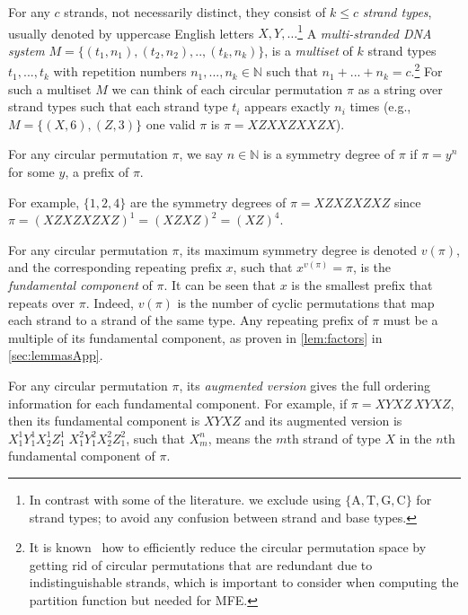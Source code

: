 For any $c$ strands, not necessarily distinct, they consist of $k \leq c$ \emph{strand types}, usually denoted by uppercase English letters $X,Y,\ldots$\footnote{In contrast with some of the literature. we exclude using $\{\mathrm{A},\mathrm{T},\mathrm{G},\mathrm{C}\}$ for strand types; to avoid any confusion between strand and base types.}
A {\em multi-stranded DNA system} 
$M = \{(t_1,n_1),(t_2,n_2), ..,(t_k,n_k)\}$,  
is a \emph{multiset} of $k$ strand types $t_1,  ..., t_k$ with repetition numbers 
$n_1,  ..., n_k \in \mathbb{N}$ such that $n_1+ ...+n_k = c$.\footnote{It is known~\cite{sawada2003fast} how to efficiently reduce the circular permutation space by getting rid of  circular permutations that are redundant due to indistinguishable strands, which is important to consider when computing the  partition function but needed for MFE.} 
For such a multiset $M$
we can think of each circular permutation $\pi$  as a string over strand types such that each strand type $t_i$ appears exactly $n_i$ times (e.g., $M = \{(X,6),(Z,3)\}$ one valid $\pi$ is $\pi = XZXXZXXZX$). 



\begin{Definition} \label{def:sym}
	For any circular permutation $\pi$, we say $n \in \mathbb{N}$ is a symmetry degree of $\pi$ if $\pi = y^n$ for some $y$, a prefix of $\pi$. 
\end{Definition}

\noindent For example, $\{1,2,4\}$ are the symmetry degrees of $\pi = XZXZXZXZ$ since $\pi = (XZXZXZXZ)^1 = (XZXZ)^2 = (XZ)^4$.

For any circular permutation $\pi$, 
its maximum symmetry degree is denoted $v(\pi)$, and the corresponding repeating prefix $x$, such that $x^{v(\pi)} = \pi$, is the \emph{fundamental component} of $\pi$. 
It can be seen that $x$ is the smallest prefix that repeats over $\pi$. 
Indeed, $v(\pi)$ is the number of cyclic permutations that map each strand to a strand of the same type. 
Any repeating prefix of $\pi$ must be a multiple of its fundamental component, as proven in \cref{lem:factors} in \cref{sec:lemmasApp}.


\begin{remark}[Notation: $X_m^n$]
	For any circular permutation $\pi$, 
	its \emph{augmented version}  gives the full ordering information for each fundamental component. 
	For example, 
	if $\pi = XYXZ \, XYXZ$, then its fundamental component is $XYXZ$ and its augmented version is 
	$ X_1^1 Y_1^1 X_2^1 Z_1^1  \; X_1^2 Y_1^2 X_2^2 Z_1^2$, such that  $X_m^n$, means the $m$th strand of type $X$ in the $n$th fundamental component of $\pi$.   
\end{remark}

